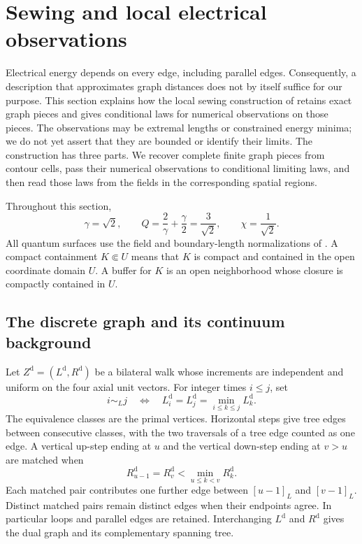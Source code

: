 \section{Sewing and local electrical observations}
\label{sec:inputs}

Electrical energy depends on every edge, including parallel edges.
Consequently, a description that approximates graph distances does not
by itself suffice for our purpose.  This section explains how the local
sewing construction of \cite{MetricMaps} retains exact graph pieces and
gives conditional laws for numerical observations on those pieces.
The observations may be extremal lengths or constrained energy minima;
we do not yet assert that they are bounded or identify their limits.
The construction has three parts.  We recover complete finite graph
pieces from contour cells, pass their numerical observations to
conditional limiting laws, and then read those laws from the fields
in the corresponding spatial regions.

Throughout this section,
\[
 \gamma=\sqrt2,\qquad Q=\frac2\gamma+\frac\gamma2=\frac3{\sqrt2},
 \qquad \chi=\frac1{\sqrt2}.
\]
All quantum surfaces use the field and boundary-length normalizations of
\cite{MetricMaps}.  A compact containment $K\Subset U$ means that $K$ is
compact and contained in the open coordinate domain $U$.  A buffer for
$K$ is an open neighborhood whose closure is compactly contained in $U$.

\subsection{The discrete graph and its continuum background}

Let $Z^{\mathrm d}=(L^{\mathrm d},R^{\mathrm d})$ be a bilateral walk
whose increments are independent and uniform on the four axial unit
vectors.  For integer times $i\le j$, set
\begin{equation}\label{inp:vertex-equivalence}
 i\sim_L j
 \quad\Longleftrightarrow\quad
 L^{\mathrm d}_i=L^{\mathrm d}_j
       =\min_{i\le k\le j}L^{\mathrm d}_k.
\end{equation}
The equivalence classes are the primal vertices.  Horizontal steps give
tree edges between consecutive classes, with the two traversals of a
tree edge counted as one edge.  A vertical up-step ending at $u$ and
the vertical down-step ending at $v>u$ are matched when
\begin{equation}\label{inp:step-match}
 R^{\mathrm d}_{u-1}=R^{\mathrm d}_v
      <\min_{u\le k<v}R^{\mathrm d}_k.
\end{equation}
Each matched pair contributes one further edge between $[u-1]_L$ and
$[v-1]_L$.  Distinct matched pairs remain distinct edges when their
endpoints agree.  In particular loops and parallel edges are retained.
Interchanging $L^{\mathrm d}$ and $R^{\mathrm d}$ gives the dual graph
and its complementary spanning tree.


